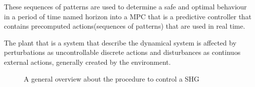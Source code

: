   These sequences of patterns are used to determine a
  safe and optimal behaviour in a period of time named horizon
  into a \ac{MPC} that is a predictive controller that 
  contains precomputed actions(sequences of patterns) that 
  are used in real time.
  
  The plant that is a system that describe the dynamical system 
  is affected by perturbations as uncontrollable discrete actions 
  and disturbances as continuos external actions, generally created
  by the environment.
  
  \begin{figure}[!hbt]
    \centering
    
    \captionsetup{format=hang}
    \caption{A general overview about the procedure to control a \ac{SHG}}
    \label{fig:perturbationsgeneration}
  \end{figure}
    
